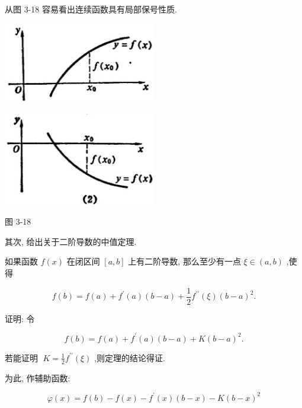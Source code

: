 \documentclass[lang=cn,newtx,12pt,scheme=chinese]{elegantbook}
\begin{document}
从图 3-18 容易看出连续函数具有局部保号性质.

\begin{center}
\includegraphics[max width=0.5\textwidth]{images/01912c18-5c3f-733d-b775-749ba9897a9d_160_145040.jpg}
\end{center}

\begin{center}
\includegraphics[max width=0.5\textwidth]{images/01912c18-5c3f-733d-b775-749ba9897a9d_160_221128.jpg}
\end{center}

图 3-18

其次, 给出关于二阶导数的中值定理.

\begin{theorem}[二阶导数中值定理]

如果函数 \(f\left( x\right)\) 在闭区间 \(\left\lbrack {a,b}\right\rbrack\) 上有二阶导数, 那么至少有一点 \(\xi \in \left( {a,b}\right)\) ,使得

\[
f\left( b\right) = f\left( a\right) + {f}^{\prime }\left( a\right) \left( {b - a}\right) + \frac{1}{2}{f}^{\prime \prime }\left( \xi \right) {\left( b - a\right) }^{2}. \tag{1}
\]

\end{theorem}

证明: 令

\[
f\left( b\right) = f\left( a\right) + {f}^{\prime }\left( a\right) \left( {b - a}\right) + K{\left( b - a\right) }^{2}. \tag{2}
\]

若能证明 \(\;K = \frac{1}{2}{f}^{\prime \prime }\left( \xi \right)\) ,则定理的结论得证.

为此, 作辅助函数:

\[
\varphi \left( x\right) = f\left( b\right) - f\left( x\right) - {f}^{\prime }\left( x\right) \left( {b - x}\right) - K{\left( b - x\right) }^{2} \tag{3}
\]
\end{document}
